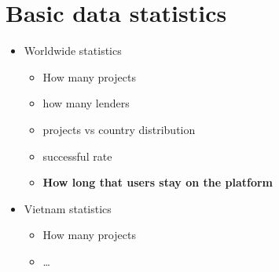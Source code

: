 \section{Basic data statistics}

\begin{itemize}
	\item Worldwide statistics
	      \begin{itemize}
		      \item How many projects
		      \item how many lenders
		      \item projects vs country distribution
		      \item successful rate
		      \item \textbf{How long that users stay on the platform}
	      \end{itemize}
	\item Vietnam statistics
	      \begin{itemize}
		      \item How many projects
		      \item \dots
	      \end{itemize}
\end{itemize}